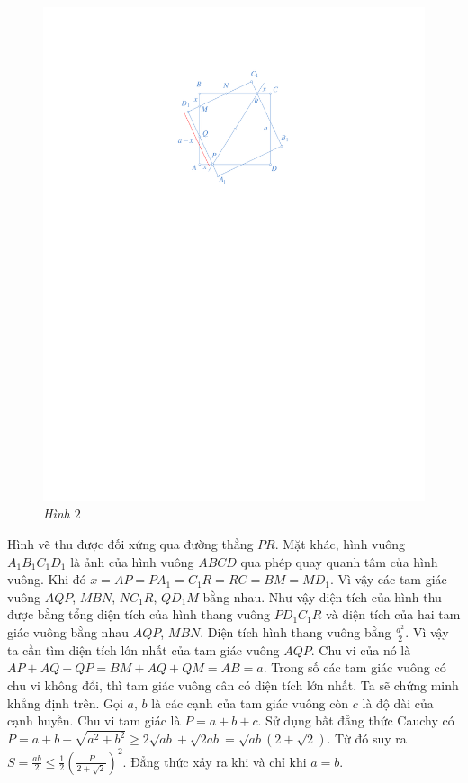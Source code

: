 \begin{multicols}{2}
\begin{figure}[H]
		\includegraphics[width= 1\linewidth]{1a.pdf}
		\caption{\small\textit{\color{cackithi}Hình $2$}}
		\vspace*{-10pt}
	\end{figure}
	Hình vẽ thu được đối xứng qua đường thẳng $PR$. Mặt khác, hình vuông $A_1B_1C_1D_1$ là ảnh của hình vuông $ABCD$ qua phép quay quanh tâm của hình vuông. Khi đó  $x = AP = P{A_1} = {C_1}R = RC = BM = M{D_1}$. Vì vậy các tam giác vuông  $AQP$,  $MBN$,  $NC_1R$, $QD_1M$ bằng nhau. 
	\vskip 0.1cm
	Như vậy diện tích của hình thu được bằng tổng diện tích của hình thang vuông $PD_1C_1R$ và diện tích của hai tam giác vuông bằng nhau  $AQP$,  $MBN$. Diện tích hình thang vuông bằng  $\frac{a^2}{2}$. Vì vậy ta cần tìm diện tích lớn nhất của tam giác vuông $AQP$. Chu vi của nó là $AP + AQ + QP = BM + AQ + QM = AB = a$. Trong số các tam giác vuông có chu vi không đổi, thì tam giác vuông cân có diện tích lớn nhất.
	\vskip 0.1cm
	Ta sẽ chứng minh khẳng định trên. Gọi $a$, $b$ là các cạnh của tam giác vuông còn $c$ là độ dài của cạnh huyền. Chu vi tam giác là $P = a + b + c$. Sử dụng bất đẳng thức Cauchy có $P = a + b + \sqrt {{a^2} + {b^2}}  \ge 2\sqrt {ab}  + \sqrt {2ab}  = \sqrt {ab} \left( {2 + \sqrt 2 } \right)$. Từ đó suy ra $S = \frac{{ab}}{2} \le \frac{1}{2}{\left( {\frac{P}{{2 + \sqrt 2 }}} \right)^2}$. Đẳng thức xảy ra khi và chỉ khi $a = b$.

\end{multicols}
